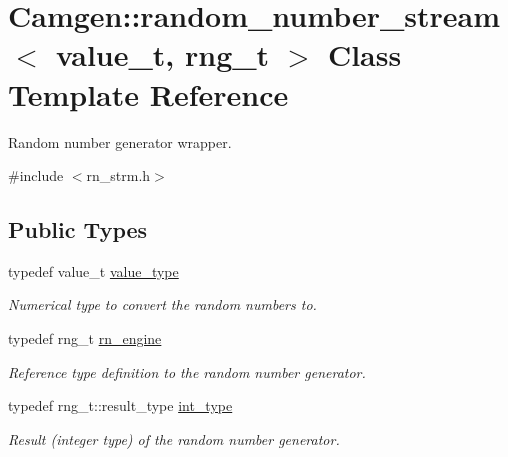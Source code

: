\hypertarget{a00460}{\section{Camgen\-:\-:random\-\_\-number\-\_\-stream$<$ value\-\_\-t, rng\-\_\-t $>$ Class Template Reference}
\label{a00460}
}


Random number generator wrapper.  




{\ttfamily \#include $<$rn\-\_\-strm.\-h$>$}

\subsection*{Public Types}
\begin{DoxyCompactItemize}
\item 
\hypertarget{a00460_a9294408b4bf4d469d2cb1682e10225a8}{typedef value\-\_\-t \hyperlink{a00460_a9294408b4bf4d469d2cb1682e10225a8}{value\-\_\-type}}\label{a00460_a9294408b4bf4d469d2cb1682e10225a8}

\begin{DoxyCompactList}\small\item\em Numerical type to convert the random numbers to. \end{DoxyCompactList}\item 
\hypertarget{a00460_a92bc880a1666c8fcd7caba5fed55009c}{typedef rng\-\_\-t \hyperlink{a00460_a92bc880a1666c8fcd7caba5fed55009c}{rn\-\_\-engine}}\label{a00460_a92bc880a1666c8fcd7caba5fed55009c}

\begin{DoxyCompactList}\small\item\em Reference type definition to the random number generator. \end{DoxyCompactList}\item 
\hypertarget{a00460_aaea501ae2db60d08b10b98b3cf499f37}{typedef rng\-\_\-t\-::result\-\_\-type \hyperlink{a00460_aaea501ae2db60d08b10b98b3cf499f37}{int\-\_\-type}}\label{a00460_aaea501ae2db60d08b10b98b3cf499f37}

\begin{DoxyCompactList}\small\item\em Result (integer type) of the random number generator. \end{DoxyCompactList}\end{DoxyCompactItemize}
